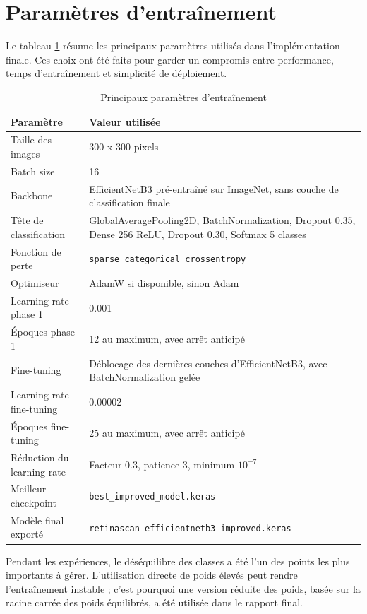 \documentclass[12pt,a4paper]{report}
\begin{document}
\section{Paramètres d'entraînement}
Le tableau \ref{tab:training_params} résume les principaux paramètres utilisés dans l'implémentation finale. Ces choix ont été faits pour garder un compromis entre performance, temps d'entraînement et simplicité de déploiement.

\begin{table}[H]
\centering
\caption{Principaux paramètres d'entraînement}
\label{tab:training_params}
\begin{tabularx}{\textwidth}{lX}
\toprule
Paramètre & Valeur utilisée \\
\midrule
Taille des images & 300 x 300 pixels \\
Batch size & 16 \\
Backbone & EfficientNetB3 pré-entraîné sur ImageNet, sans couche de classification finale \\
Tête de classification & GlobalAveragePooling2D, BatchNormalization, Dropout 0.35, Dense 256 ReLU, Dropout 0.30, Softmax 5 classes \\
Fonction de perte & \texttt{sparse\_categorical\_crossentropy} \\
Optimiseur & AdamW si disponible, sinon Adam \\
Learning rate phase 1 & 0.001 \\
Époques phase 1 & 12 au maximum, avec arrêt anticipé \\
Fine-tuning & Déblocage des dernières couches d'EfficientNetB3, avec BatchNormalization gelée \\
Learning rate fine-tuning & 0.00002 \\
Époques fine-tuning & 25 au maximum, avec arrêt anticipé \\
Réduction du learning rate & Facteur 0.3, patience 3, minimum \(10^{-7}\) \\
Meilleur checkpoint & \texttt{best\_improved\_model.keras} \\
Modèle final exporté & \texttt{retinascan\_efficientnetb3\_improved.keras} \\
\bottomrule
\end{tabularx}
\end{table}

Pendant les expériences, le déséquilibre des classes a été l'un des points les plus importants à gérer. L'utilisation directe de poids élevés peut rendre l'entraînement instable ; c'est pourquoi une version réduite des poids, basée sur la racine carrée des poids équilibrés, a été utilisée dans le rapport final.
\end{document}
